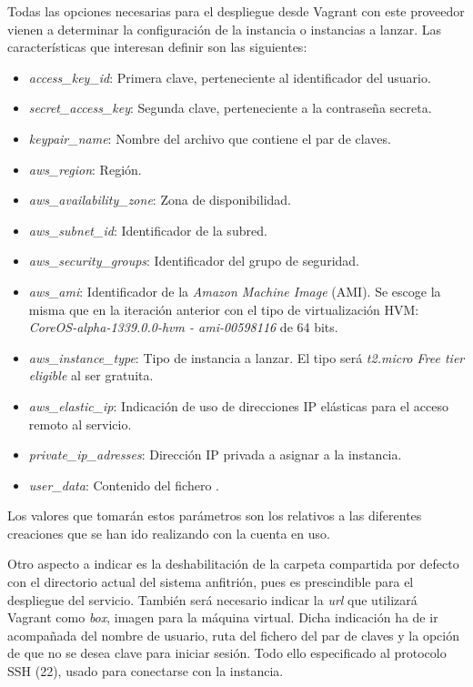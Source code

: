 Todas las opciones necesarias para el despliegue desde Vagrant con este proveedor vienen a determinar la configuración de la instancia o instancias a lanzar. Las características que interesan definir son las siguientes:
\begin{itemize}
\item \textit{access\_key\_id}: Primera clave, perteneciente al identificador del usuario.
\item \textit{secret\_access\_key}: Segunda clave, perteneciente a la contraseña secreta.
\item \textit{keypair\_name}: Nombre del archivo que contiene el par de claves.
\item \textit{aws\_region}: Región.
\item \textit{aws\_availability\_zone}: Zona de disponibilidad.
\item \textit{aws\_subnet\_id}: Identificador de la subred.
\item \textit{aws\_security\_groups}: Identificador del grupo de seguridad.
\item \textit{aws\_ami}: Identificador de la \textit{Amazon Machine Image} (AMI). Se escoge la misma que en la iteración anterior con el tipo de virtualización HVM: \textit{CoreOS-alpha-1339.0.0-hvm - ami-00598116} de 64 bits.
\item \textit{aws\_instance\_type}: Tipo de instancia a lanzar. El tipo será \textit{t2.micro Free tier eligible} al ser gratuita.
\item \textit{aws\_elastic\_ip}: Indicación de uso de direcciones IP elásticas para el acceso remoto al servicio.
\item \textit{private\_ip\_adresses}: Dirección IP privada a asignar a la instancia.
\item \textit{user\_data}: Contenido del fichero .
\end{itemize}

Los valores que tomarán estos parámetros son los relativos a las diferentes creaciones que se han ido realizando con la cuenta en uso.

Otro aspecto a indicar es la deshabilitación de la carpeta compartida por defecto  con el directorio actual del sistema anfitrión, pues es prescindible para el despliegue del servicio. También será necesario indicar la \textit{url} que utilizará Vagrant como \textit{box}, imagen para la máquina virtual. Dicha indicación ha de ir acompañada del nombre de usuario, ruta del fichero del par de claves y la opción de que no se desea clave para iniciar sesión. Todo ello especificado al protocolo SSH (22), usado para conectarse con la instancia.

